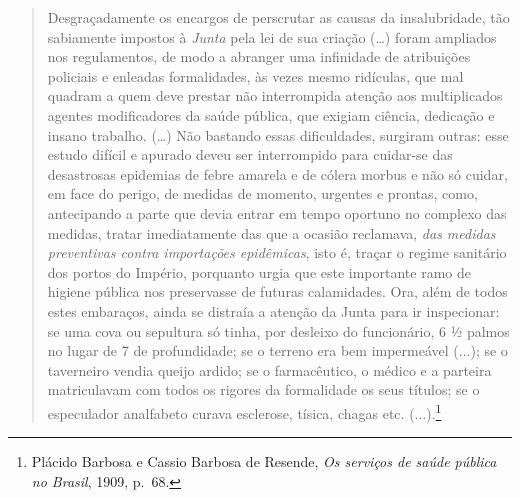 \begin{quote}
Desgraçadamente os encargos de perscrutar as causas da insalubridade,
tão sabiamente impostos à \emph{Junta} pela lei de sua criação
(\ldots{}) foram ampliados nos regulamentos, de modo a abranger uma
infinidade de atribuições policiais e enleadas formalidades, às vezes
mesmo ridículas, que mal quadram a quem deve prestar não interrompida
atenção aos multiplicados agentes modificadores da saúde pública, que
exigiam ciência, dedicação e insano trabalho. (\ldots{}) Não bastando
essas dificuldades, surgiram outras: esse estudo difícil e apurado deveu
ser interrompido para cuidar-se das desastrosas epidemias de febre
amarela e de cólera morbus e não só cuidar, em face do perigo, de
medidas de momento, urgentes e prontas, como, antecipando a parte que
devia entrar em tempo oportuno no complexo das medidas, tratar
imediatamente das que a ocasião reclamava, \emph{das medidas preventivas
contra importações epidêmicas}, isto é, traçar o regime sanitário dos
portos do Império, porquanto urgia que este importante ramo de higiene
pública nos preservasse de futuras calamidades. Ora, além de todos estes
embaraços, ainda se distraía a atenção da Junta para ir inspecionar: se
uma cova ou sepultura só tinha, por desleixo do funcionário, 6 ½ palmos
no lugar de 7 de profundidade; se o terreno era bem impermeável (...);
se o taverneiro vendia queijo ardido; se o farmacêutico, o médico e a
parteira matriculavam com todos os rigores da formalidade os seus
títulos; se o especulador analfabeto curava esclerose, tísica, chagas
etc. (...).\footnote{Plácido Barbosa e Cassio Barbosa de Resende,
  \emph{Os serviços de saúde pública no Brasil}, 1909, p.~68.}
\end{quote}


